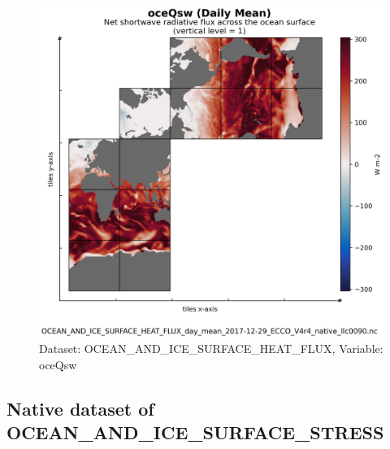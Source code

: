 \begin{figure}[H]
\centering
\includegraphics[scale=0.55]{../images/plots/native_plots/Ocean_and_Sea-Ice_Surface_Heat_Fluxes/oceQsw.png}
\caption{Dataset: OCEAN\_AND\_ICE\_SURFACE\_HEAT\_FLUX, Variable: oceQsw}
\label{tab:table-OCEAN_AND_ICE_SURFACE_HEAT_FLUX_oceQsw-Plot}
\end{figure}
\newpage
\subsection{Native dataset of OCEAN\_AND\_ICE\_SURFACE\_STRESS}
\newp
